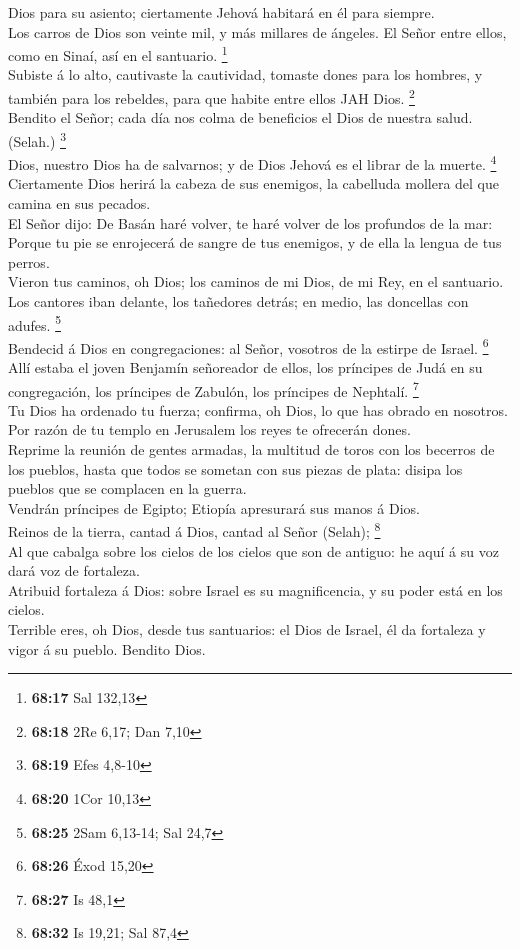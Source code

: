Dios para su asiento; ciertamente Jehová habitará en él para siempre.\\
 Los carros de Dios son veinte mil, y más millares de
ángeles. El Señor entre ellos, como en Sinaí, así en el santuario.
\footnote{\textbf{68:17} Sal 132,13}\\
 Subiste á lo alto, cautivaste la cautividad, tomaste dones
para los hombres, y también para los rebeldes, para que habite entre
ellos JAH Dios. \footnote{\textbf{68:18} 2Re 6,17; Dan 7,10}\\
 Bendito el Señor; cada día nos colma de beneficios el Dios
de nuestra salud. (Selah.) \footnote{\textbf{68:19} Efes 4,8-10}\\
 Dios, nuestro Dios ha de salvarnos; y de Dios Jehová es el
librar de la muerte. \footnote{\textbf{68:20} 1Cor 10,13}\\
 Ciertamente Dios herirá la cabeza de sus enemigos, la
cabelluda mollera del que camina en sus pecados.\\
 El Señor dijo: De Basán haré volver, te haré volver de los
profundos de la mar:\\
 Porque tu pie se enrojecerá de sangre de tus enemigos, y
de ella la lengua de tus perros.\\
 Vieron tus caminos, oh Dios; los caminos de mi Dios, de mi
Rey, en el santuario.\\
 Los cantores iban delante, los tañedores detrás; en medio,
las doncellas con adufes. \footnote{\textbf{68:25} 2Sam 6,13-14; Sal
  24,7}\\
 Bendecid á Dios en congregaciones: al Señor, vosotros de
la estirpe de Israel. \footnote{\textbf{68:26} Éxod 15,20}\\
 Allí estaba el joven Benjamín señoreador de ellos, los
príncipes de Judá en su congregación, los príncipes de Zabulón, los
príncipes de Nephtalí. \footnote{\textbf{68:27} Is 48,1}\\
 Tu Dios ha ordenado tu fuerza; confirma, oh Dios, lo que
has obrado en nosotros.\\
 Por razón de tu templo en Jerusalem los reyes te ofrecerán
dones.\\
 Reprime la reunión de gentes armadas, la multitud de toros
con los becerros de los pueblos, hasta que todos se sometan con sus
piezas de plata: disipa los pueblos que se complacen en la guerra.\\
 Vendrán príncipes de Egipto; Etiopía apresurará sus manos
á Dios.\\
 Reinos de la tierra, cantad á Dios, cantad al Señor
(Selah); \footnote{\textbf{68:32} Is 19,21; Sal 87,4}\\
 Al que cabalga sobre los cielos de los cielos que son de
antiguo: he aquí á su voz dará voz de fortaleza.\\
 Atribuid fortaleza á Dios: sobre Israel es su
magnificencia, y su poder está en los cielos.\\
 Terrible eres, oh Dios, desde tus santuarios: el Dios de
Israel, él da fortaleza y vigor á su pueblo. Bendito Dios.

